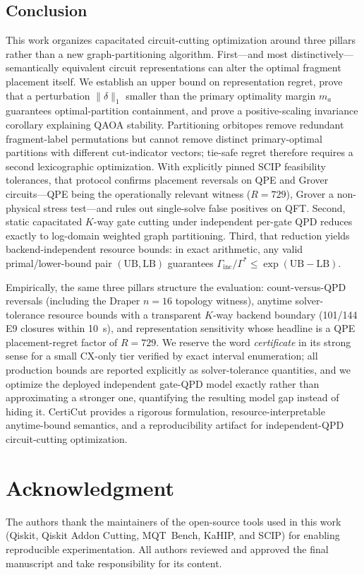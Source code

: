 \documentclass[11pt]{article}
\newcommand{\CertiCut}{CertiCut}
\newcommand{\CertiCut}{\textsc{CertiCut}}
\newcommand{\LB}{\mathrm{LB}}
\newcommand{\UB}{\mathrm{UB}}
\begin{document}
\subsection{Conclusion}

This work organizes capacitated circuit-cutting optimization around three pillars rather than a new graph-partitioning algorithm. First---and most distinctively---semantically equivalent circuit representations can alter the optimal fragment placement itself. We establish an upper bound on representation regret, prove that a perturbation $\|\delta\|_1$ smaller than the primary optimality margin $m_a$ guarantees optimal-partition containment, and prove a positive-scaling invariance corollary explaining QAOA stability. Partitioning orbitopes remove redundant fragment-label permutations but cannot remove distinct primary-optimal partitions with different cut-indicator vectors; tie-safe regret therefore requires a second lexicographic optimization. With explicitly pinned SCIP feasibility tolerances, that protocol confirms placement reversals on QPE and Grover circuits---QPE being the operationally relevant witness ($R=729$), Grover a non-physical stress test---and rules out single-solve false positives on QFT. Second, static capacitated $K$-way gate cutting under independent per-gate QPD reduces exactly to log-domain weighted graph partitioning. Third, that reduction yields backend-independent resource bounds: in exact arithmetic, any valid primal/lower-bound pair $(\UB,\LB)$ guarantees $\Gamma_{\mathrm{inc}}/\Gamma^* \le \exp(\UB-\LB)$.

Empirically, the same three pillars structure the evaluation: count-versus-QPD reversals (including the Draper $n=16$ topology witness), anytime solver-tolerance resource bounds with a transparent $K$-way backend boundary (101/144 E9 closures within 10~s), and representation sensitivity whose headline is a QPE placement-regret factor of $R=729$. We reserve the word \emph{certificate} in its strong sense for a small CX-only tier verified by exact interval enumeration; all production bounds are reported explicitly as solver-tolerance quantities, and we optimize the deployed independent gate-QPD model exactly rather than approximating a stronger one, quantifying the resulting model gap instead of hiding it. \CertiCut{} provides a rigorous formulation, resource-interpretable anytime-bound semantics, and a reproducibility artifact for independent-QPD circuit-cutting optimization.

\ifdefined\quantumversion
\else
\section*{Acknowledgment}
The authors thank the maintainers of the open-source tools used in this work (Qiskit, Qiskit Addon Cutting, MQT~Bench, KaHIP, and SCIP) for enabling reproducible experimentation. All authors reviewed and approved the final manuscript and take responsibility for its content.
\fi
\end{document}
